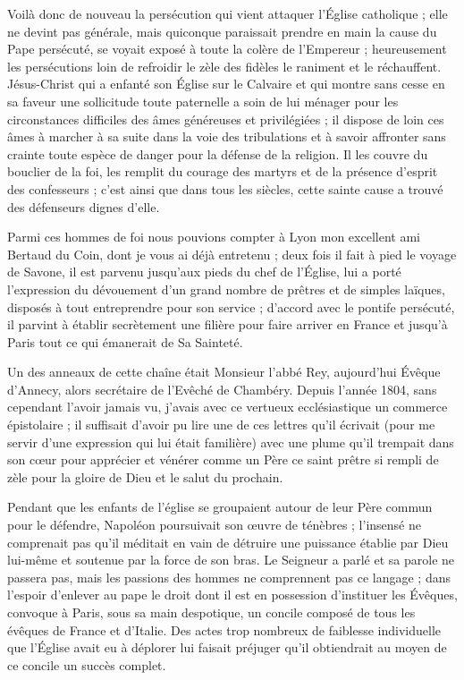 \documentclass[11pt,a4paper]{report}
\begin{document}
Voilà donc de nouveau la persécution qui vient attaquer l'Église catholique ; elle ne devint pas générale, mais quiconque paraissait prendre en main la cause du Pape persécuté, se voyait exposé à toute la colère de l'Empereur ; heureusement les persécutions loin de refroidir le zèle des fidèles le raniment et le réchauffent. Jésus-Christ qui a enfanté son Église sur le Calvaire et qui montre sans cesse en sa faveur une sollicitude toute paternelle a soin de lui ménager pour les circonstances difficiles des âmes généreuses et privilégiées ; il dispose de loin ces âmes à marcher à sa suite dans la voie des tribulations et à savoir affronter sans crainte toute espèce de danger pour la défense de la religion. Il les couvre du bouclier de la foi, les remplit du courage des martyrs et de la présence d'esprit des confesseurs ; c'est ainsi que dans tous les siècles, cette sainte cause a trouvé des défenseurs dignes d'elle.

Parmi ces hommes de foi nous pouvions compter à Lyon mon excellent ami Bertaud du Coin, dont je vous ai déjà entretenu ; deux fois il fait à pied le voyage de Savone, il est parvenu jusqu'aux pieds du chef de l'Église, lui a porté l'expression du dévouement d'un grand nombre de prêtres et de simples laïques, disposés à tout entreprendre pour son service ; d'accord avec le pontife persécuté, il parvint à établir secrètement une filière pour faire arriver en France et jusqu'à Paris tout ce qui émanerait de Sa Sainteté.

Un des anneaux de cette chaîne était Monsieur l'abbé Rey, aujourd'hui Évêque d'Annecy, alors secrétaire de l'Evêché de Chambéry. Depuis l'année 1804, sans cependant l'avoir jamais vu, j'avais avec ce vertueux ecclésiastique un commerce épistolaire ; il suffisait d'avoir pu lire une de ces lettres qu'il écrivait (pour me servir d'une expression qui lui était familière) avec une plume qu'il trempait dans son cœur pour apprécier et vénérer comme un Père ce saint prêtre si rempli de zèle pour la gloire de Dieu et le salut du prochain.

Pendant que les enfants de l'église se groupaient autour de leur Père commun pour le défendre, Napoléon poursuivait son œuvre de ténèbres ; l'insensé ne comprenait pas qu'il méditait en vain de détruire une puissance établie par Dieu lui-même et soutenue par la force de son bras. Le Seigneur a parlé et sa parole ne passera pas, mais les passions des hommes ne comprennent pas ce langage ; dans l'espoir d'enlever au pape le droit dont il est en possession d'instituer les Évêques, convoque à Paris, sous sa main despotique, un concile composé de tous les évêques de France et d'Italie. Des actes trop nombreux de faiblesse individuelle que l'Église avait eu à déplorer lui faisait préjuger qu'il obtiendrait au moyen de ce concile un succès complet.
\end{document}
